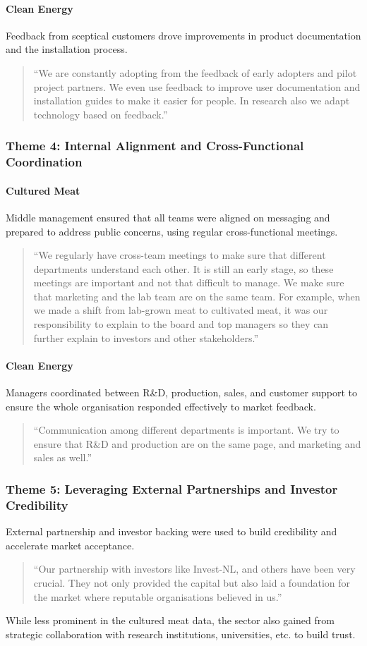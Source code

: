\paragraph{Clean Energy}
Feedback from sceptical customers drove improvements in product documentation and the installation process.
\begin{quote}
	“We are constantly adopting from the feedback of early adopters and pilot project partners. We even use feedback to improve user documentation and installation guides to make it easier for people. In research also we adapt technology based on feedback.”
\end{quote}

\subsubsection{Theme 4: Internal Alignment and Cross-Functional Coordination}
\paragraph{Cultured Meat}
Middle management ensured that all teams were aligned on messaging and prepared to address public concerns, using regular cross-functional meetings.
\begin{quote}
	“We regularly have cross-team meetings to make sure that different departments understand each other. It is still an early stage, so these meetings are important and not that difficult to manage. We make sure that marketing and the lab team are on the same team. For example, when we made a shift from lab-grown meat to cultivated meat, it was our responsibility to explain to the board and top managers so they can further explain to investors and other stakeholders.”
\end{quote}

\paragraph{Clean Energy}
Managers coordinated between R\&D, production, sales, and customer support to ensure the whole organisation responded effectively to market feedback.
\begin{quote}
	“Communication among different departments is important. We try to ensure that R\&D and production are on the same page, and marketing and sales as well.”
\end{quote}

\subsubsection{Theme 5: Leveraging External Partnerships and Investor Credibility}
External partnership and investor backing were used to build credibility and accelerate market acceptance.
\begin{quote}
	“Our partnership with investors like Invest-NL, and others have been very crucial. They not only provided the capital but also laid a foundation for the market where reputable organisations believed in us.”
\end{quote}
While less prominent in the cultured meat data, the sector also gained from strategic collaboration with research institutions, universities, etc. to build trust.

